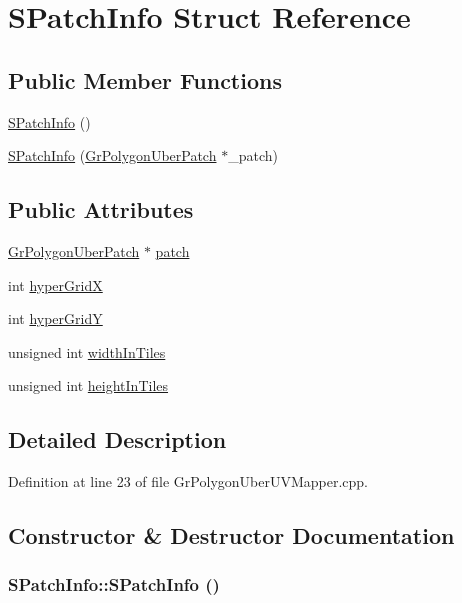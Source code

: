 \hypertarget{struct_s_patch_info}{
\section{SPatchInfo Struct Reference}
\label{struct_s_patch_info}
}
\subsection*{Public Member Functions}
\begin{CompactItemize}
\item 
\hyperlink{struct_s_patch_info_8c8b994120d15f0660eac3d8eb3af046}{SPatchInfo} ()
\item 
\hyperlink{struct_s_patch_info_4b4682e6d73154569bc8ca299ab855cf}{SPatchInfo} (\hyperlink{class_gr_polygon_uber_patch}{GrPolygonUberPatch} $\ast$\_\-patch)
\end{CompactItemize}
\subsection*{Public Attributes}
\begin{CompactItemize}
\item 
\hyperlink{class_gr_polygon_uber_patch}{GrPolygonUberPatch} $\ast$ \hyperlink{struct_s_patch_info_91b27df287e15a05ccb21a23b9ab7346}{patch}
\item 
int \hyperlink{struct_s_patch_info_d0421f5b9103e13978690243214d8c49}{hyperGridX}
\item 
int \hyperlink{struct_s_patch_info_f63b67693d9f04b7bc8ba5ff3417b78e}{hyperGridY}
\item 
unsigned int \hyperlink{struct_s_patch_info_71b540a6a51523516098c78ebc36868e}{widthInTiles}
\item 
unsigned int \hyperlink{struct_s_patch_info_2950f8cae1b56d69c51feeaa4522887e}{heightInTiles}
\end{CompactItemize}


\subsection{Detailed Description}


Definition at line 23 of file GrPolygonUberUVMapper.cpp.

\subsection{Constructor \& Destructor Documentation}
\hypertarget{struct_s_patch_info_8c8b994120d15f0660eac3d8eb3af046}{
\subsubsection[{SPatchInfo}]{\setlength{\rightskip}{0pt plus 5cm}SPatchInfo::SPatchInfo ()}}
\label{struct_s_patch_info_8c8b994120d15f0660eac3d8eb3af046}




